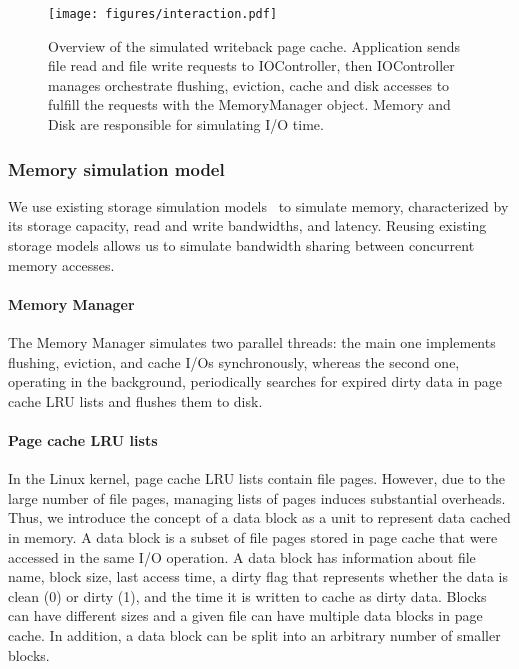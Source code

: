 \documentclass[conference]{IEEEtran}
\begin{document}
            \begin{figure}
                \centering
                \texttt{[image: figures/interaction.pdf]}
                   \caption{Overview of the simulated writeback page cache.
                   Application sends file read and file write requests to IOController,
                   then IOController manages orchestrate flushing, eviction, cache and
                   disk accesses to fulfill the requests with the MemoryManager object.
                   Memory and Disk are responsible for simulating I/O time.}
                   \label{fig:interaction}
            \end{figure}

            \subsubsection{Memory simulation model}
            
            We use existing storage simulation models~\cite{lebre2015} to simulate memory,
            characterized by its storage capacity, read and write bandwidths,
            and latency. Reusing existing storage models allows us 
            to simulate bandwidth sharing between concurrent memory accesses.

            \paragraph*{Memory Manager}
            The Memory Manager simulates two parallel threads: the main one
            implements flushing, eviction, and cache I/Os synchronously,
            whereas the second one, operating in the background,
            periodically searches for expired dirty data in page cache LRU
            lists and flushes them to disk.

            \paragraph*{Page cache LRU lists}
            In the Linux kernel, page cache LRU lists contain file pages. However, 
            due to the large number of file pages, managing lists of pages 
            induces substantial overheads.
            Thus, we introduce the concept of a data block as a unit to represent data 
            cached in memory. A data block is a subset of file pages stored in
            page cache that were accessed in the same I/O operation. 
            A data block has information about file name, block size, last access 
            time, a dirty flag that represents whether the data is clean (0) 
            or dirty (1), and the time it is written to cache as dirty data. 
            Blocks can have different sizes and a given file can have multiple 
            data blocks in page cache. In addition, a data block can be split into an 
            arbitrary number of smaller blocks.
\end{document}
